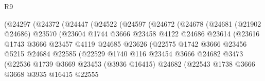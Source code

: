 \begin{lexlean}{R9}
\begin{coremodule}
                        (@24297
                          (@24372
                            (@24447
                              (@24522
                                (@24597
                                  (@24672
                                    (@24678
                                      (@24681
                                        (@21902 @24686)
                                        @23570
                                        (@23604
                                          @1744
                                          @3666
                                          @23458
                                          @4122
                                          @24686
                                          @23614
                                          (@23616
                                            @1743
                                            @3666
                                            @23457
                                            @4119
                                            @24685
                                            @23626
                                            (@22575
                                              @1742
                                              @3666
                                              @23456
                                              @5215
                                              @24684
                                              @22585
                                              (@22529
                                                @1740
                                                @116
                                                @23454
                                                @3666
                                                @24682
                                                @3473
                                                (@22536
                                                  @1739
                                                  @3669
                                                  @23453
                                                  (@3936 @16415)
                                                  @24682
                                                  (@22543
                                                    @1738
                                                    @3666
                                                    @3668
                                                    @3935
                                                    @16415
                                                    @22555

\end{coremodule}
\end{lexlean}
